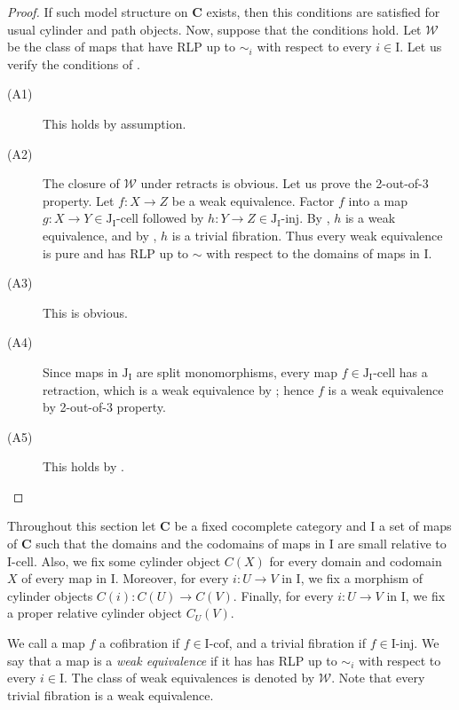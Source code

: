 \documentclass{amsart}
\theoremstyle{definition}
\newcommand{\we}{\mathcal{W}}
\newcommand{\cat}[1]{\mathbf{#1}}
\newcommand{\C}{\cat{C}}
\newcommand{\I}{\mathrm{I}}
\newcommand{\J}{\mathrm{J}}
\newcommand{\class}[2]{#1\text{-}\mathrm{#2}}
\newcommand{\Iinj}[1][\I]{\class{#1}{inj}}
\newcommand{\Icell}[1][\I]{\class{#1}{cell}}
\newcommand{\Icof}[1][\I]{\class{#1}{cof}}
\newcommand{\Jinj}[1][]{\Iinj[\J#1]}
\newcommand{\Jcell}[1][]{\Icell[\J#1]}
\begin{document}
\begin{proof}
If such model structure on $\C$ exists, then this conditions are satisfied for usual cylinder and path objects.
Now, suppose that the conditions hold.
Let $\we$ be the class of maps that have RLP up to $\sim_i$ with respect to every $i \in \I$.
Let us verify the conditions of .
\begin{description}
\item[(A1)] This holds by assumption.
\item[(A2)] The closure of $\we$ under retracts is obvious.
Let us prove the 2-out-of-3 property.
Let $f : X \to Z$ be a weak equivalence.
Factor $f$ into a map $g : X \to Y \in \Jcell[_\I]$ followed by $h : Y \to Z \in \Jinj[_\I]$.
By , $h$ is a weak equivalence, and by , $h$ is a trivial fibration.
Thus every weak equivalence is pure and has RLP up to $\sim$ with respect to the domains of maps in $\I$.
\item[(A3)] This is obvious.
\item[(A4)] Since maps in $\J_\I$ are split monomorphisms, every map
$f \in \Jcell[_\I]$ has a retraction, which is a weak equivalence by
; hence $f$ is a weak equivalence by 2-out-of-3 property.
\item[(A5)] This holds by .
\end{description}
\end{proof}

Throughout this section let $\C$ be a fixed cocomplete category and $\I$ a set of maps of $\C$
such that the domains and the codomains of maps in $\I$ are small relative to $\Icell$.
Also, we fix some cylinder object $C(X)$ for every domain and codomain $X$ of every map in $\I$.
Moreover, for every $i : U \to V$ in $\I$, we fix a morphism of cylinder objects $C(i) : C(U) \to C(V)$.
Finally, for every $i : U \to V$ in $\I$, we fix a proper relative cylinder object $C_U(V)$.

We call a map $f$ a cofibration if $f \in \Icof$, and a trivial fibration if $f \in \Iinj$.
We say that a map is a \emph{weak equivalence} if it has has RLP up to $\sim_i$ with respect to every $i \in \I$.
The class of weak equivalences is denoted by $\we$.
Note that every trivial fibration is a weak equivalence.
\end{document}
